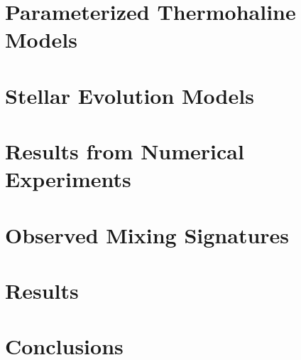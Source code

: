 \documentclass[linenumbers,twocolumn]{aastex62}
\begin{document}
\section{Parameterized Thermohaline Models }
\label{sec:parameterizations}


\section{Stellar Evolution Models} 
\label{sec:mesa_experiment}


\section{Results from Numerical Experiments }
\label{sec:mesa_results}


\section{Observed Mixing Signatures }
\label{sec:obs}


\section{Results} 
\label{sec:punchline}


\section{Conclusions }
\label{sec:conclusions}



\begin{comment}
\begin{figure}[!htb]
\begin{center}
\texttt{[image: ./Figs/protversusloggmodelpmmPYboth.eps]}%
\caption{The measured core rotation rates for the stars in our sample as a function of gravity compared to the predictions of our solid body model (lue) and our moerately differentially convection zone (pink), showing that these models provide limits on the allowable amount of radial differential rotation in the surface convection zone.}
\label{Fig:bothmodels}
\end{center}
\end{figure}
\end{comment}
\end{document}
